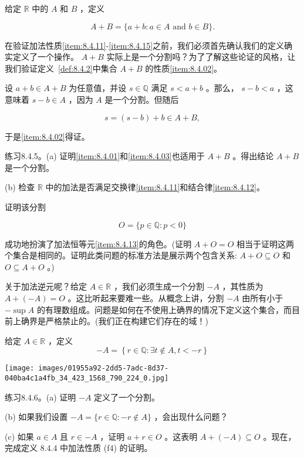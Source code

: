 给定 \(\mathbb{R}\) 中的 \(A\) 和 \(B\) ，定义

\[
A + B = \{ a + b : a \in  A\text{ and }b \in  B\} .
\]

在验证加法性质\ref{item:8.4.11}-\ref{item:8.4.15}之前，我们必须首先确认我们的定义确实定义了一个操作。 \(A + B\) 实际上是一个分割吗？为了了解这些论证的风格，让我们验证定义~\ref{def:8.4.2}中集合 \(A + B\) 的性质\ref{item:8.4.02}。

设 \(a + b \in  A + B\) 为任意值，并设 \(s \in  \mathbb{Q}\) 满足 \(s < a + b\) 。那么， \(s - b < a\) ，这意味着 \(s - b \in  A\) ，因为 \(A\) 是一个分割。但随后

\[
s = \left( {s - b}\right)  + b \in  A + B,
\]

于是\ref{item:8.4.02}得证。

练习8.4.5。(a) 证明\ref{item:8.4.01}和\ref{item:8.4.03}也适用于 \(A + B\) 。得出结论 \(A + B\) 是一个分割。

(b) 检查 \(\mathbb{R}\) 中的加法是否满足交换律\ref{item:8.4.11}和结合律\ref{item:8.4.12}。

证明该分割

\[
O = \{ p \in  \mathbb{Q} : p < 0\}
\]

成功地扮演了加法恒等元\ref{item:8.4.13}的角色。(证明 \(A + O = O\) 相当于证明这两个集合是相同的。证明此类问题的标准方法是展示两个包含关系: \(A + O \subseteq  O\) 和 \(O \subseteq  A + O\) 。)

关于加法逆元呢？给定 \(A \in  \mathbb{R}\) ，我们必须生成一个分割 \(- A\) ，其性质为 \(A + \left( {-A}\right)  = O\) 。这比听起来要难一些。从概念上讲，分割 \(- A\) 由所有小于 \(- \sup A\) 的有理数组成。问题是如何在不使用上确界的情况下定义这个集合，而目前上确界是严格禁止的。(我们正在构建它们存在的域！)

给定 \(A \in  \mathbb{R}\) ，定义
$$
-A = \left\{ r \in \mathbb{Q}: \exists t\notin A, t<-r \right\}
$$
\begin{center}
\texttt{[image: images/01955a92-2dd5-7adc-8d37-040ba4c1a4fb\_34\_423\_1568\_790\_224\_0.jpg]}
\end{center}
\hspace*{3em} 

练习8.4.6。(a) 证明 \(- A\) 定义了一个分割。

(b) 如果我们设置 \(- A = \{ r \in  \mathbb{Q} :  - r \notin  A\}\) ，会出现什么问题？

(c) 如果 \(a \in  A\) 且 \(r \in   - A\) ，证明 \(a + r \in  O\) 。这表明 \(A + \left( {-A}\right)  \subseteq  O\) 。现在，完成定义 8.4.4 中加法性质 (f4) 的证明。


